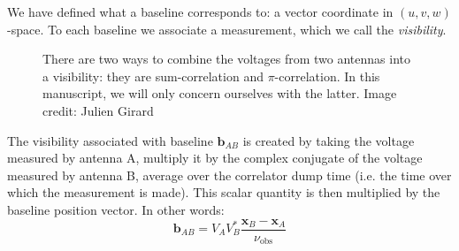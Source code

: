 \pg
We have defined what a baseline corresponds to: a vector coordinate in $(u,v,w)$-space. To each baseline we associate a measurement, which we call the \emph{visibility}. 
\begin{figure}[ht]
\centering
{}
\caption{\label{fig.visibility} There are two ways to combine the voltages from two antennas into a visibility: they are sum-correlation and $\pi$-correlation. In this manuscript, we will only concern ourselves with the latter. Image credit: Julien Girard}
\end{figure}
The visibility associated with baseline $\mathbf{b}_{AB}$ is created by taking the voltage measured by antenna A, multiply it by the complex conjugate of the voltage measured by antenna B, average over the correlator dump time (i.e. the time over which the measurement is made). This scalar quantity is then multiplied by the baseline position vector. In other words:
\begin{equation}
\mathbf{b}_{AB} = V_{A} V_{B}^* \frac{\mathbf{x}_{B}-\mathbf{x}_{A}}{\nu_\mathrm{obs}}
\end{equation}

